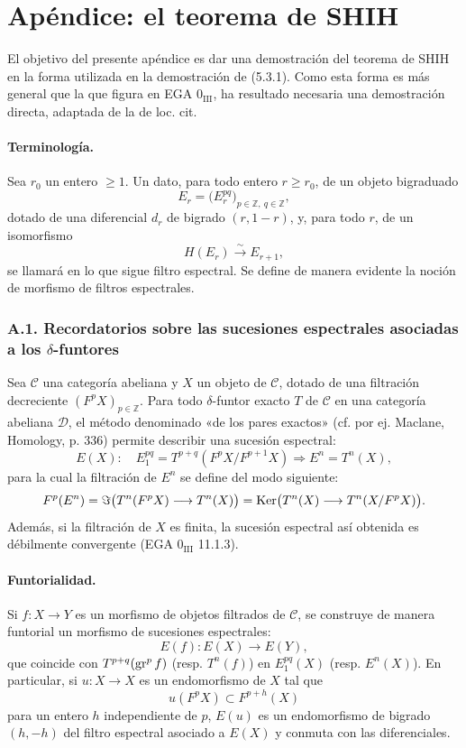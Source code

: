 \section*{Apéndice: el teorema de SHIH}

El objetivo del presente apéndice es dar una demostración del teorema de SHIH en la forma utilizada en la demostración de (5.3.1). Como esta forma es más general que la que figura en EGA \(0_{\mathrm{III}}\), ha resultado necesaria una demostración directa, adaptada de la de loc. cit.

\paragraph{Terminología.}
Sea \(r_0\) un entero \(\ge1\). Un dato, para todo entero \(r\ge r_0\), de un objeto bigraduado
\[
E_r=\bigl(E_r^{pq}\bigr)_{p\in\mathbb Z,\ q\in\mathbb Z},
\]
dotado de una diferencial \(d_r\) de bigrado \((r,1-r)\), y, para todo \(r\), de un isomorfismo
\[
H(E_r)\xrightarrow{\sim}E_{r+1},
\]
se llamará en lo que sigue filtro espectral. Se define de manera evidente la noción de morfismo de filtros espectrales.

\subsubsection*{A.1. Recordatorios sobre las sucesiones espectrales asociadas a los \(\delta\)-funtores}

Sea \(\mathcal C\) una categoría abeliana y \(X\) un objeto de \(\mathcal C\), dotado de una filtración decreciente \((F^pX)_{p\in\mathbb Z}\). Para todo \(\delta\)-funtor exacto \(T\) de \(\mathcal C\) en una categoría abeliana \(\mathcal D\), el método denominado «de los pares exactos» (cf. por ej. Maclane, Homology, p. 336) permite describir una sucesión espectral:
\[
E(X):\quad E_1^{pq}=T^{p+q}(F^pX/F^{p+1}X)\Rightarrow E^n=T^n(X),
\]
para la cual la filtración de \(E^n\) se define del modo siguiente:
\[
F^p(E^n)=\Im\bigl(T^n(F^pX)\longrightarrow T^n(X)\bigr)
=\operatorname{Ker}\bigl(T^n(X)\longrightarrow T^n(X/F^pX)\bigr).
\]
Además, si la filtración de \(X\) es finita, la sucesión espectral así obtenida es débilmente convergente (EGA \(0_{\mathrm{III}}\) 11.1.3).

\paragraph{Funtorialidad.}
Si \(f:X\to Y\) es un morfismo de objetos filtrados de \(\mathcal C\), se construye de manera funtorial un morfismo de sucesiones espectrales:
\[
E(f):E(X)\longrightarrow E(Y),
\]
que coincide con \(T^{p+q}(\operatorname{gr}^p f)\) (resp. \(T^n(f)\)) en \(E_1^{pq}(X)\) (resp. \(E^n(X)\)). En particular, si \(u:X\to X\) es un endomorfismo de \(X\) tal que
\[
u(F^pX)\subset F^{p+h}(X)
\]
para un entero \(h\) independiente de \(p\), \(E(u)\) es un endomorfismo de bigrado \((h,-h)\) del filtro espectral asociado a \(E(X)\) y conmuta con las diferenciales.
